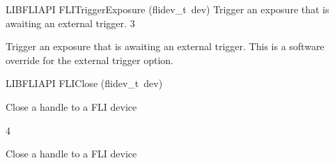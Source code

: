 \documentclass{article}
\begin{document}
\begin{cxxfunction}
{LIBFLIAPI}
        {FLITriggerExposure}
        {(flidev\_t\ dev)}
        {
 Trigger an exposure that is awaiting an external trigger.}
        {3}
\begin{cxxdoc}

Trigger an exposure that is awaiting an external trigger. This is a 
software override for the external trigger option.


\end{cxxdoc}
\end{cxxfunction}
\begin{cxxfunction}
{LIBFLIAPI}
        {FLIClose}
        {(flidev\_t\ dev)}
        {
 Close a handle to a FLI device
 
 }
        {4}
\begin{cxxdoc}

Close a handle to a FLI device


\end{cxxdoc}
\end{cxxfunction}
\end{document}
